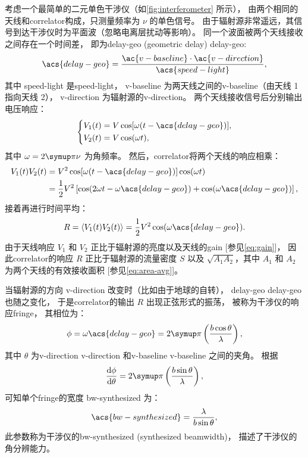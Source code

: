 考虑一个最简单的二元单色干涉仪（如\autoref{fig:interferometer} 所示），
由两个相同的天线和\ac{correlator}构成，只测量频率为 $\nu$ 的单色信号。
由于辐射源非常遥远，其信号到达干涉仪时为平面波（忽略电离层扰动等影响）。
同一个波面被两个天线接收之间存在一个时间差，
即为\acl{delay-geo} (geometric delay) \ac{delay-geo}:
\begin{equation}
  \acs{delay-geo} =
    \frac{\ac{v-baseline} \cdot \ac{v-direction}}{\acs{speed-light}} ,
\end{equation}
其中 \acs{speed-light} 是\acl{speed-light}，
\ac{v-baseline} 为两天线之间的\acl{v-baseline}（由天线 1 指向天线 2），
\ac{v-direction} 为辐射源的\acl{v-direction}。
两个天线接收信号后分别输出电压响应：
\begin{equation}
  \left\{
    \begin{aligned}
      V_1(t) &= V \cos [\omega (t - \acs{delay-geo})] , \\
      V_2(t) &= V \cos (\omega t) ,
    \end{aligned}
  \right.
\end{equation}
其中 $\omega = 2\Cpi\nu$ 为角频率。
然后，\ac{correlator}将两个天线的响应相乘：
\begin{align}
  V_1(t) V_2(t)
    &= V^2 \cos [\omega (t - \acs{delay-geo})] \cos (\omega t) \\
    &= \frac{1}{2} V^2 \left[ \cos (2\omega t - \omega \acs{delay-geo})
      + \cos (\omega \acs{delay-geo}) \right] ,
\end{align}
接着再进行时间平均：
\begin{equation}
  \label{eq:resp-corr}
  R = \langle V_1(t) V_2(t) \rangle
    = \frac{1}{2} V^2 \cos (\omega \acs{delay-geo}) .
\end{equation}
由于天线响应 $V_1$ 和 $V_2$ 正比于辐射源的亮度以及天线的\ac{gain}
[参见\autoref{eq:gain}]，
因此\ac{correlator}的响应 $R$ 正比于辐射源的流量密度 $S$
以及 $\sqrt{A_1 A_2}$，其中 $A_1$ 和 $A_2$ 为两个天线的有效接收面积
[参见\autoref{eq:area-avg}]。

当辐射源的方向 \ac{v-direction} 改变时（比如由于地球的自转），
\acl{delay-geo} \acs{delay-geo} 也随之变化，
于是\ac{correlator}的输出 $R$ 出现正弦形式的振荡，
被称为干涉仪的响应\acf{fringe}，
其相位为：
\begin{equation}
  \phi = \omega \acs{delay-geo}
    = 2\Cpi \left( \frac{b \cos\theta}{\lambda} \right) ,
\end{equation}
其中 $\theta$ 为\acl{v-direction} \ac{v-direction}
和\acl{v-baseline} \ac{v-baseline} 之间的夹角。
根据
\begin{equation}
  \diff{\phi}{\theta}
    = 2\Cpi \left( \frac{b \sin\theta}{\lambda} \right) ,
\end{equation}
可知单个\ac{fringe}的宽度 \acs{bw-synthesized} 为：
\begin{equation}
  \label{eq:bw-synthesized}
  \acs{bw-synthesized} = \frac{\lambda}{b \sin\theta} ,
\end{equation}
此参数称为干涉仪的\acl{bw-synthesized} (synthesized beamwidth)，
描述了干涉仪的角分辨能力。

